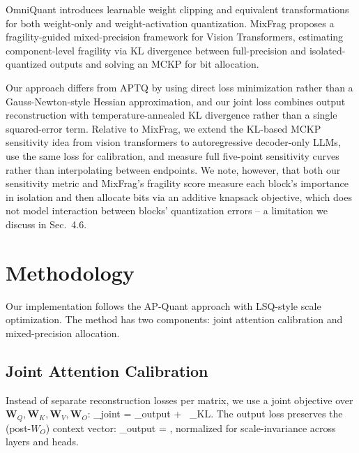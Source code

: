 \documentclass[10pt,twocolumn,letterpaper]{article}
\let\oldequation\equation
\let\oldendequation\endequation
\renewenvironment{equation}{\oldequation\small}{\oldendequation}
\begin{document}
OmniQuant \cite{shao2024omniquant} introduces learnable weight clipping and equivalent transformations for both weight-only and weight-activation quantization. MixFrag \cite{mixfrag2025} proposes a fragility-guided mixed-precision framework for Vision Transformers, estimating component-level fragility via KL divergence between full-precision and isolated-quantized outputs and solving an MCKP for bit allocation.

Our approach differs from APTQ by using direct loss minimization rather than a Gauss-Newton-style Hessian approximation, and our joint loss combines output reconstruction with temperature-annealed KL divergence rather than a single squared-error term. Relative to MixFrag, we extend the KL-based MCKP sensitivity idea from vision transformers to autoregressive decoder-only LLMs, use the same loss for calibration, and measure full five-point sensitivity curves rather than interpolating between endpoints. We note, however, that both our sensitivity metric and MixFrag's fragility score measure each block's importance in isolation and then allocate bits via an additive knapsack objective, which does not model interaction between blocks' quantization errors -- a limitation we discuss in Sec.~4.6.

\section{Methodology}

Our implementation follows the AP-Quant approach with LSQ-style \cite{esser2020lsq} scale optimization. The method has two components: joint attention calibration and mixed-precision allocation.

\subsection{Joint Attention Calibration}

Instead of separate reconstruction losses per matrix, we use a joint objective over $\mathbf{W}_Q,\mathbf{W}_K,\mathbf{W}_V,\mathbf{W}_O$:
\begin{equation}
_{joint} = _{output} + \lambda\, _{KL}.
\end{equation}
The output loss preserves the (post-$W_O$) context vector:
\begin{equation}
_{output} = ,
\end{equation}
normalized for scale-invariance across layers and heads.
\end{document}
